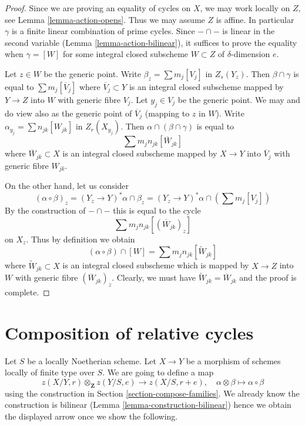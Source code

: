\documentclass{stacks-project}
\theoremstyle{plain}
\theoremstyle{definition}
\theoremstyle{remark}
\numberwithin{equation}{subsection}
\begin{document}
\begin{proof}
Since we are proving an equality of cycles on $X$, we may work locally
on $Z$, see Lemma \ref{lemma-action-opens}. Thus we may assume $Z$
is affine. In particular $\gamma$ is a finite linear combination of prime
cycles. Since $- \cap -$ is linear in the second variable
(Lemma \ref{lemma-action-bilinear}), it suffices
to prove the equality when $\gamma = [W]$ for some integral closed subscheme
$W \subset Z$ of $\delta$-dimension $e$.

\medskip\noindent
Let $z \in W$ be the generic point. Write $\beta_z = \sum m_j[V_j]$
in $Z_s(Y_z)$. Then $\beta \cap \gamma$ is equal to $\sum m_j[\overline{V}_j]$
where $\overline{V}_j \subset Y$ is an integral closed subscheme
mapped by $Y \to Z$ into $W$ with generic fibre $V_j$.
Let $y_j \in V_j$ be the generic point. We may and do view
also as the generic point of $\overline{V}_j$ (mapping to $z$ in $W$).
Write $\alpha_{y_j} = \sum n_{jk} [W_{jk}]$ in $Z_r(X_{y_j})$.
Then $\alpha \cap (\beta \cap \gamma)$ is equal to
$$
\sum m_j n_{jk} [\overline{W}_{jk}]
$$
where $\overline{W}_{jk} \subset X$ is an integral closed subscheme
mapped by $X \to Y$ into $\overline{V}_j$ with generic fibre $W_{jk}$.

\medskip\noindent
On the other hand, let us consider
$$
(\alpha \circ \beta)_z = (Y_z \to Y)^*\alpha \cap \beta_z =
(Y_z \to Y)^*\alpha \cap (\sum m_j [V_j])
$$
By the construction of $- \cap -$ this is equal to the cycle
$$
\sum m_j n_{jk} [(\overline{W}_{jk})_z]
$$
on $X_z$. Thus by definition we obtain
$$
(\alpha \circ \beta) \cap [W] =
\sum m_j n_{jk} [\widetilde{W}_{jk}]
$$
where $\widetilde{W}_{jk} \subset X$ is an integral closed subscheme which
is mapped by $X \to Z$ into $W$ with generic fibre $(\overline{W}_{jk})_z$.
Clearly, we must have $\widetilde{W}_{jk} = \overline{W}_{jk}$
and the proof is complete.
\end{proof}









\section{Composition of relative cycles}
\label{section-compose}

\noindent
Let $S$ be a locally Noetherian scheme. Let $X \to Y$
be a morphism of schemes locally of finite type over $S$.
We are going to define a map
$$
z(X/Y, r) \otimes_\mathbf{Z} z(Y/S, e) \longrightarrow z(X/S, r + e),\quad
\alpha \otimes \beta \longmapsto \alpha \circ \beta
$$
using the construction in Section \ref{section-compose-families}.
We already know the construction is bilinear
(Lemma \ref{lemma-construction-bilinear})
hence we obtain the displayed arrow once we show the following.
\end{document}
